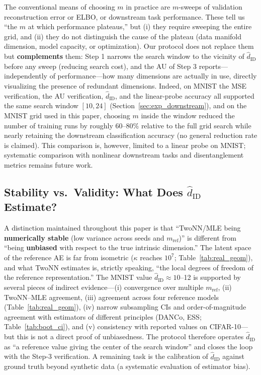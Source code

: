 \documentclass[make,article,submit,pdftex,moreauthors]{Definitions/mdpi}
\newcommand{\hatdID}{\hat{d}_{\mathrm{ID}}}
\newcommand{\kap}{\kappa}
\begin{document}
The conventional means of choosing $m$ in practice are $m$-sweeps of
validation reconstruction error or ELBO, or downstream task performance.
These tell us ``the $m$ at which performance plateaus,'' but
(i) they require sweeping the entire grid, and
(ii) they do not distinguish the cause of the plateau (data manifold
dimension, model capacity, or optimization).
Our protocol does not replace them but \textbf{complements} them:
Step 1 narrows the search window to the vicinity of $\hatdID$ before any
sweep (reducing search cost), and the AU of Step 3 reports---independently
of performance---how many dimensions are actually in use, directly
visualizing the presence of redundant dimensions.
Indeed, on MNIST the MSE verification, the AU verification, $\hatdID$, and
the linear-probe accuracy all supported the same search window $[10, 24]$
(Section~\ref{sec:exp_downstream}), and on the MNIST grid used in this
paper, choosing $m$ inside the window reduced the number of training runs
by roughly 60--80\% relative to the full grid search while nearly retaining
the downstream classification accuracy (no general reduction rate is
claimed).
This comparison is, however, limited to a linear probe on MNIST; systematic
comparison with nonlinear downstream tasks and disentanglement metrics
remains future work.

\subsection{Stability vs.\ Validity: What Does $\hatdID$ Estimate?}\label{sec:disc_twonn}

A distinction maintained throughout this paper is that
``TwoNN/MLE being \textbf{numerically stable} (low variance across seeds and
$m_{\mathrm{ref}}$)'' is different from ``being \textbf{unbiased} with
respect to the true intrinsic dimension.''
The latent space of the reference AE is far from isometric ($\kap$ reaches
$10^{7}$; Table~\ref{tab:real_geom}), and what TwoNN estimates is, strictly
speaking, ``the local degrees of freedom of the reference representation.''
The MNIST value $\hatdID \approx 10$--12 is supported by several pieces of
indirect evidence---(i) convergence over multiple $m_{\mathrm{ref}}$,
(ii) TwoNN--MLE agreement, (iii) agreement across four reference models
(Table~\ref{tab:real_geom}), (iv) narrow subsampling CIs and
order-of-magnitude agreement with estimators of different principles
(DANCo, ESS; Table~\ref{tab:boot_ci}), and (v) consistency with reported
values on CIFAR-10---but this is not a direct proof of unbiasedness.
The protocol therefore operates $\hatdID$ as ``a reference value giving the
center of the search window'' and closes the loop with the Step-3
verification.
A remaining task is the calibration of $\hatdID$ against ground truth beyond
synthetic data (a systematic evaluation of estimator bias).
\end{document}
